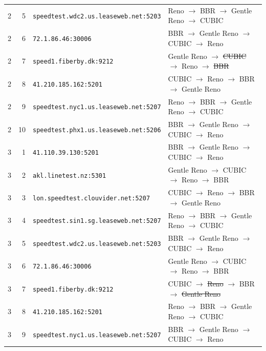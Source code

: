 \begin{longtable}{rrll}
2 & 5 & \texttt{speedtest.\allowbreak{}wdc2.\allowbreak{}us.\allowbreak{}leaseweb.\allowbreak{}net:5203} & Reno $\to$ BBR $\to$ Gentle Reno $\to$ CUBIC \\
2 & 6 & \texttt{72.\allowbreak{}1.\allowbreak{}86.\allowbreak{}46:30006} & BBR $\to$ Gentle Reno $\to$ CUBIC $\to$ Reno \\
2 & 7 & \texttt{speed1.\allowbreak{}fiberby.\allowbreak{}dk:9212} & Gentle Reno $\to$ \sout{CUBIC} $\to$ Reno $\to$ \sout{BBR} \\
2 & 8 & \texttt{41.\allowbreak{}210.\allowbreak{}185.\allowbreak{}162:5201} & CUBIC $\to$ Reno $\to$ BBR $\to$ Gentle Reno \\
2 & 9 & \texttt{speedtest.\allowbreak{}nyc1.\allowbreak{}us.\allowbreak{}leaseweb.\allowbreak{}net:5207} & Reno $\to$ BBR $\to$ Gentle Reno $\to$ CUBIC \\
2 & 10 & \texttt{speedtest.\allowbreak{}phx1.\allowbreak{}us.\allowbreak{}leaseweb.\allowbreak{}net:5206} & BBR $\to$ Gentle Reno $\to$ CUBIC $\to$ Reno \\
3 & 1 & \texttt{41.\allowbreak{}110.\allowbreak{}39.\allowbreak{}130:5201} & BBR $\to$ Gentle Reno $\to$ CUBIC $\to$ Reno \\
3 & 2 & \texttt{akl.\allowbreak{}linetest.\allowbreak{}nz:5301} & Gentle Reno $\to$ CUBIC $\to$ Reno $\to$ BBR \\
3 & 3 & \texttt{lon.\allowbreak{}speedtest.\allowbreak{}clouvider.\allowbreak{}net:5207} & CUBIC $\to$ Reno $\to$ BBR $\to$ Gentle Reno \\
3 & 4 & \texttt{speedtest.\allowbreak{}sin1.\allowbreak{}sg.\allowbreak{}leaseweb.\allowbreak{}net:5207} & Reno $\to$ BBR $\to$ Gentle Reno $\to$ CUBIC \\
3 & 5 & \texttt{speedtest.\allowbreak{}wdc2.\allowbreak{}us.\allowbreak{}leaseweb.\allowbreak{}net:5203} & BBR $\to$ Gentle Reno $\to$ CUBIC $\to$ Reno \\
3 & 6 & \texttt{72.\allowbreak{}1.\allowbreak{}86.\allowbreak{}46:30006} & Gentle Reno $\to$ CUBIC $\to$ Reno $\to$ BBR \\
3 & 7 & \texttt{speed1.\allowbreak{}fiberby.\allowbreak{}dk:9212} & CUBIC $\to$ \sout{Reno} $\to$ BBR $\to$ \sout{Gentle Reno} \\
3 & 8 & \texttt{41.\allowbreak{}210.\allowbreak{}185.\allowbreak{}162:5201} & Reno $\to$ BBR $\to$ Gentle Reno $\to$ CUBIC \\
3 & 9 & \texttt{speedtest.\allowbreak{}nyc1.\allowbreak{}us.\allowbreak{}leaseweb.\allowbreak{}net:5207} & BBR $\to$ Gentle Reno $\to$ CUBIC $\to$ Reno \\

\end{longtable}
